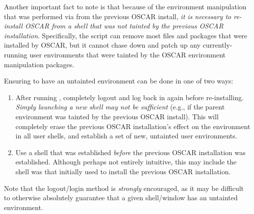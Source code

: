Another important fact to note is that because of the environment
manipulation that was performed via  from the previous
OSCAR install, {\em it is necessary to re-install OSCAR from a shell
  that was not tainted by the previous OSCAR installation}.
Specifically, the  script can remove most files and
packages that were installed by OSCAR, but it cannot chase down and
patch up any currently-running user environments that were tainted by
the OSCAR environment manipulation packages.

Ensuring to have an untainted environment can be done in one of two
ways:

\begin{enumerate}
\item After running , completely logout and log back
  in again before re-installing.  {\em Simply launching a new shell
    may not be sufficient} (e.g., if the parent environment was
  tainted by the previous OSCAR install).  This will completely erase
  the previous OSCAR installation's effect on the environment in all
  user shells, and establish a set of new, untainted user
  environments.

\item Use a shell that was established {\em before} the previous OSCAR
  installation was established.  Although perhaps not entirely
  intuitive, this may include the shell was that initially used to
  install the previous OSCAR installation.
\end{enumerate}

Note that the logout/login method is {\em strongly} encouraged, as it
may be difficult to otherwise absolutely guarantee that a given
shell/window has an untainted environment.

